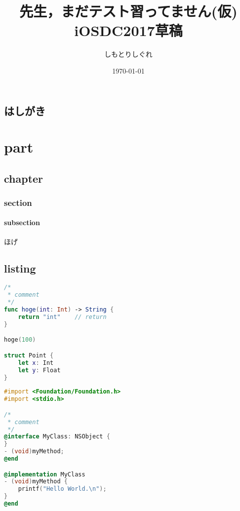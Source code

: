 \documentclass[10pt,twoside,openright,dvipdfmx]{jsbook}
\title{%
    先生，まだテスト習ってません(仮) \\
    \large iOSDC2017草稿}
\author[$\dagger$]{しもとりしぐれ}
\affil[$\dagger$]{@S\_Shimotori}
\date{\today}
\newcommand\blankpage{%
    \null
    \thispagestyle{empty}
    \addtocounter{page}{-1}
    \newpage
}
\begin{document}
\maketitle
\restoregeometry

\afterpage{\blankpage}


\tableofcontents
\thispagestyle{plain}

\chapter*{はしがき}
\thispagestyle{plain}


\cleardoublepage
{}


\part{part}
\restoregeometry

\chapter{chapter}
\thispagestyle{plain}
\section{section}
\subsection{subsection}
ほげ\cite{hoge}
\chapter{listing}
\thispagestyle{plain}
\begin{lstlisting}[language=swift,caption=キャプション,label=ラベル]
/*
 * comment
 */
func hoge(int: Int) -> String {
    return "int"    // return
}

hoge(100)

struct Point {
    let x: Int
    let y: Float
}
\end{lstlisting}
\begin{lstlisting}[language=objectivec,caption=キャプション,label=ラベル]
#import <Foundation/Foundation.h>
#import <stdio.h>

/*
 * comment
 */
@interface MyClass: NSObject {
}
- (void)myMethod;
@end

@implementation MyClass
- (void)myMethod {
    printf("Hello World.\n");
}
@end
\end{lstlisting}
\end{document}
